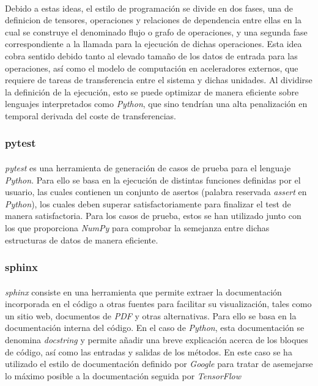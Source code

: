 \documentclass{subfiles}
\begin{document}
          \paragraph{}
          Debido a estas ideas, el estilo de programación se divide en dos fases, una de definicion de tensores, operaciones y relaciones de dependencia entre ellas en la cual se construye el denominado flujo o grafo de operaciones, y una segunda fase correspondiente a la llamada para la ejecución de dichas operaciones. Esta idea cobra sentido debido tanto al elevado tamaño de los datos de entrada para las operaciones, así como el modelo de computación en aceleradores externos, que requiere de tareas de transferencia entre el sistema y dichas unidades. Al dividirse la definición de la ejecución, esto se puede optimizar de manera eficiente sobre lenguajes interpretados como \emph{Python}, que sino tendrían una alta penalización en temporal derivada del coste de transferencias.

        \subsubsection{pytest}
        \label{sec:tensorflow}

          \paragraph{}
          \emph{pytest} es una herramienta de generación de casos de prueba para el lenguaje \emph{Python}. Para ello se basa en la ejecución de distintas funciones definidas por el usuario, las cuales contienen un conjunto de asertos (palabra reservada \emph{assert} en \emph{Python}), los cuales deben superar satisfactoriamente para finalizar el test de manera satisfactoria. Para los casos de prueba, estos se han utilizado junto con los que proporciona \emph{NumPy} para comprobar la semejanza entre dichas estructuras de datos de manera eficiente.

        \subsubsection{sphinx}
        \label{sec:sphinx}

          \paragraph{}
          \emph{sphinx} consiste en una herramienta que permite extraer la documentación incorporada en el código a otras fuentes para facilitar su visualización, tales como un sitio web, documentos de \emph{PDF} y otras alternativas. Para ello se basa en la documentación interna del código. En el caso de \emph{Python}, esta documentación se denomina \emph{docstring} y permite añadir una breve explicación acerca de los bloques de código, así como las entradas y salidas de los métodos. En este caso se ha utilizado el estilo de documentación definido por \emph{Google} para tratar de asemejarse lo máximo posible a la documentación seguida por \emph{TensorFlow}
\end{document}

